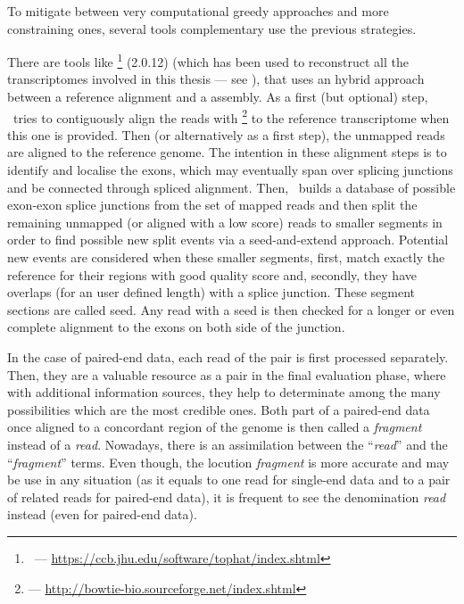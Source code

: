 To mitigate between very computational greedy approaches and more constraining
ones, several tools complementary use the previous strategies.

There are tools like \toph\footnote{\toph\ ---
\href{https://ccb.jhu.edu/software/tophat/index.shtml}
{https://ccb.jhu.edu/software/tophat/index.shtml}} (2.0.12) 
(which has been used to reconstruct all the
transcriptomes involved in this thesis --- see ),
that uses an hybrid approach between a reference alignment and a 
assembly. As a first (but optional) step, \toph\ tries to contiguously
align the reads with \footnote{ ---
\href{http://bowtie-bio.sourceforge.net/index.shtml}%
{http://bowtie-bio.sourceforge.net/index.shtml}} 
to the reference transcriptome when this one is provided. Then
(or alternatively as a first step), the unmapped reads are aligned to the
reference genome. The intention in these alignment steps is to identify and
localise the exons, which may eventually span over splicing junctions and be
connected through spliced alignment. Then, \toph\ builds a database of
possible exon-exon splice junctions from the set of mapped reads and then split
the remaining unmapped (or aligned with a low score) reads to smaller segments
in order to find
possible new split events via a seed-and-extend approach. Potential new events
are considered when these smaller segments, first, match exactly the reference
for their regions with good quality score and, secondly, they have overlaps
(for an user defined length) with a splice junction. These segment sections are
called seed. Any read with a seed is then checked for a longer or even complete
alignment to the exons on both side of the junction.

In the case of paired-end data, each read of the pair is first processed
separately. Then, they are a valuable resource as a pair in the final evaluation
phase, where with additional
information sources, they help to determinate among the many possibilities which
are the most credible ones. Both part of a paired-end data once aligned to a
concordant region of the genome is then called a \emph{fragment} instead of a
\emph{read}. Nowadays, there is an assimilation between the ``\emph{read}''
and the ``\emph{fragment}'' terms. Even though, the locution \emph{fragment}
is more accurate and may be use in any situation (as it equals to one read for
single-end data and to a pair of related reads for paired-end data), it is
frequent to see the denomination \emph{read} instead (even for paired-end data).

